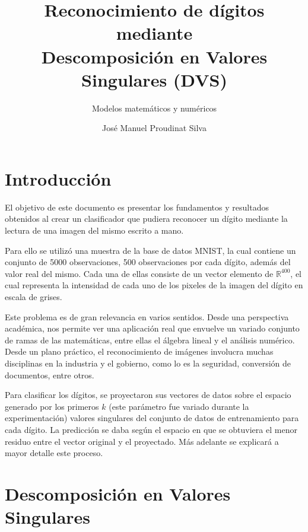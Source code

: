 \documentclass[12pt]{article}
\newcommand{\real}{\mathbb{R}}
\begin{document}
\title{\textbf{Reconocimiento de dígitos mediante \\Descomposición en Valores Singulares (DVS)}}
\author{Modelos matemáticos y numéricos}
\date{Jos\'e Manuel Proudinat Silva}
\maketitle


\section{Introducción}

El objetivo de este documento es presentar los fundamentos y resultados obtenidos al crear un clasificador que pudiera reconocer un dígito mediante la lectura de una imagen del mismo escrito a mano. 

Para ello se utilizó una muestra de la base de datos MNIST, la cual contiene un conjunto de 5000 observaciones, 500 observaciones por cada dígito, además del valor real del mismo. Cada una de ellas consiste de un vector elemento de $\real^{400}$, el cual representa la intensidad de cada uno de los pixeles de la imagen del dígito en escala de grises.

Este problema es de gran relevancia en varios sentidos. Desde una perspectiva académica, nos permite ver una aplicación real que envuelve un variado conjunto de ramas de las matemáticas, entre ellas el álgebra lineal y el análisis numérico. Desde un plano práctico, el reconocimiento de imágenes involucra muchas disciplinas en la industria y el gobierno, como lo es la seguridad, conversión de documentos, entre otros.

Para clasificar los dígitos, se proyectaron sus vectores de datos sobre el espacio generado por los primeros $k$ (este parámetro fue variado durante la experimentación) valores singulares del conjunto de datos de entrenamiento para cada dígito. La predicción se daba según el espacio en que se obtuviera el menor residuo entre el vector original y el proyectado. Más adelante se explicará a mayor detalle este proceso.




\section{Descomposición en Valores Singulares}
\end{document}
